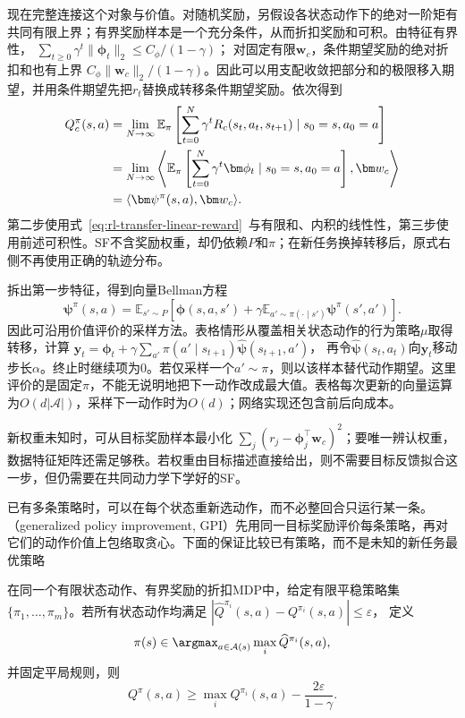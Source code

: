 现在完整连接这个对象与价值。对随机奖励，另假设各状态动作下的绝对一阶矩有共同有限上界；有界奖励样本是一个充分条件，从而折扣奖励和可积。由特征有界性，
$\sum_{t\geq0}\gamma^t\lVert\bm\phi_t\rVert_2\leq C_\phi/(1-\gamma)$；
对固定有限$\bm w_c$，条件期望奖励的绝对折扣和也有上界
$C_\phi\lVert\bm w_c\rVert_2/(1-\gamma)$。因此可以用支配收敛把部分和的极限移入期望，并用条件期望先把$r_t$替换成转移条件期望奖励。依次得到
\begin{align}
 Q_c^\pi(s,a)
 &=\lim_{N\to\infty}\mathbb E_\pi
       \left[\sum_{t=0}^{N}\gamma^t R_c(s_t,a_t,s_{t+1})
       \mid s_0=s,a_0=a\right]\notag\\
 &=\lim_{N\to\infty}\left\langle
       \mathbb E_\pi\left[\sum_{t=0}^{N}\gamma^t\bm\phi_t
       \mid s_0=s,a_0=a\right],\bm w_c\right\rangle\notag\\
 &=\langle\bm\psi^\pi(s,a),\bm w_c\rangle.
 \label{eq:rl-transfer-sf-value}
\end{align}
第二步使用式~\eqref{eq:rl-transfer-linear-reward}~与有限和、内积的线性性，第三步使用前述可积性。SF不含奖励权重，却仍依赖$P$和$\pi$；在新任务换掉转移后，原式右侧不再使用正确的轨迹分布。

拆出第一步特征，得到向量Bellman方程
\begin{equation}
 \bm\psi^\pi(s,a)=
 \mathbb E_{s'\sim P}\left[\bm\phi(s,a,s')
 +\gamma\mathbb E_{a'\sim\pi(\cdot\mid s')}\bm\psi^\pi(s',a')\right].
 \label{eq:rl-transfer-sf-bellman}
\end{equation}
因此可沿用价值评价的采样方法。表格情形从覆盖相关状态动作的行为策略$\mu$取得转移，计算
$\bm y_t=\bm\phi_t+\gamma\sum_{a'}\pi(a'\mid s_{t+1})\widehat{\bm\psi}(s_{t+1},a')$，
再令$\widehat{\bm\psi}(s_t,a_t)$向$\bm y_t$移动步长$\alpha$。终止时继续项为0。若仅采样一个$a'\sim\pi$，则以该样本替代动作期望。这里评价的是固定$\pi$，不能无说明地把下一动作改成最大值。表格每次更新的向量运算为$O(d|\mathcal A|)$，采样下一动作时为$O(d)$；网络实现还包含前后向成本。

新权重未知时，可从目标奖励样本最小化
$\sum_j(r_j-\bm\phi_j^\top\bm w_c)^2$；要唯一辨认权重，数据特征矩阵还需足够秩。若权重由目标描述直接给出，则不需要目标反馈拟合这一步，但仍需要在共同动力学下学好的SF。

已有多条策略时，可以在每个状态重新选动作，而不必整回合只运行某一条。（generalized policy improvement, GPI）先用同一目标奖励评价每条策略，再对它们的动作价值上包络取贪心。下面的保证比较已有策略，而不是未知的新任务最优策略

\begin{theorem}[有一致估计误差的广义策略改进]
 \label{thm:rl-transfer-gpi}
 在同一个有限状态动作、有界奖励的折扣MDP中，给定有限平稳策略集
 $\{\pi_1,\ldots,\pi_m\}$。若所有状态动作均满足
 $|\widehat Q^{\pi_i}(s,a)-Q^{\pi_i}(s,a)|\leq\varepsilon$，
 定义
 \[
 \pi(s)\in\argmax_{a\in\mathcal A(s)}\max_i\widehat Q^{\pi_i}(s,a),
 \]
 并固定平局规则，则
 \begin{equation}
 Q^\pi(s,a)\geq\max_iQ^{\pi_i}(s,a)
                -\frac{2\varepsilon}{1-\gamma}.
 \label{eq:rl-transfer-gpi-bound}
 \end{equation}
\end{theorem}

